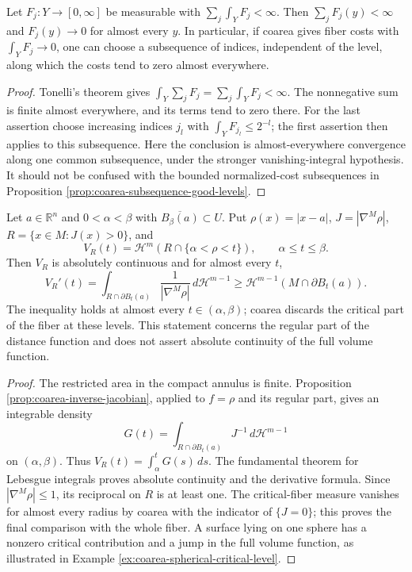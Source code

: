 \begin{proposition}\label{prop:coarea-summable-fiber-errors}
Let $F_j:Y\to[0,\infty]$ be measurable with $\sum_j\int_YF_j<\infty$. Then $\sum_jF_j(y)<\infty$ and $F_j(y)\to0$ for almost every $y$. In particular, if coarea gives fiber costs with $\int_YF_j\to0$, one can choose a subsequence of indices, independent of the level, along which the costs tend to zero almost everywhere.
\end{proposition}
\begin{proof}
Tonelli's theorem gives $\int_Y\sum_jF_j=\sum_j\int_YF_j<\infty$. The nonnegative sum is finite almost everywhere, and its terms tend to zero there. For the last assertion choose increasing indices $j_l$ with $\int_YF_{j_l}\leq2^{-l}$; the first assertion then applies to this subsequence. Here the conclusion is almost-everywhere convergence along one common subsequence, under the stronger vanishing-integral hypothesis. It should not be confused with the bounded normalized-cost subsequences in Proposition \ref{prop:coarea-subsequence-good-levels}.
\end{proof}

\begin{proposition}\label{prop:rectifiable-distance-volume-derivative}
Let $a\in\mathbb R^n$ and $0<\alpha<\beta$ with $\overline{B_\beta(a)}\subset U$. Put $\rho(x)=|x-a|$, $J=|\nabla^M\rho|$, $R=\{x\in M:J(x)>0\}$, and
\[
 V_R(t)=\mathcal H^m(R\cap\{\alpha<\rho<t\}),\qquad \alpha\leq t\leq\beta.
\]
Then $V_R$ is absolutely continuous and for almost every $t$,
\[
 V_R'(t)=\int_{R\cap\partial B_t(a)}\frac1{|\nabla^M\rho|}\,d\mathcal H^{m-1}
 \geq\mathcal H^{m-1}(M\cap\partial B_t(a)).
\]
The inequality holds at almost every $t\in(\alpha,\beta)$; coarea discards the critical part of the fiber at these levels. This statement concerns the regular part of the distance function and does not assert absolute continuity of the full volume function.
\end{proposition}
\begin{proof}
The restricted area in the compact annulus is finite. Proposition \ref{prop:coarea-inverse-jacobian}, applied to $f=\rho$ and its regular part, gives an integrable density
\[
 G(t)=\int_{R\cap\partial B_t(a)}J^{-1}\,d\mathcal H^{m-1}
\]
on $(\alpha,\beta)$. Thus $V_R(t)=\int_\alpha^tG(s)\,ds$. The fundamental theorem for Lebesgue integrals proves absolute continuity and the derivative formula. Since $|\nabla^M\rho|\leq1$, its reciprocal on $R$ is at least one. The critical-fiber measure vanishes for almost every radius by coarea with the indicator of $\{J=0\}$; this proves the final comparison with the whole fiber. A surface lying on one sphere has a nonzero critical contribution and a jump in the full volume function, as illustrated in Example \ref{ex:coarea-spherical-critical-level}.
\end{proof}
